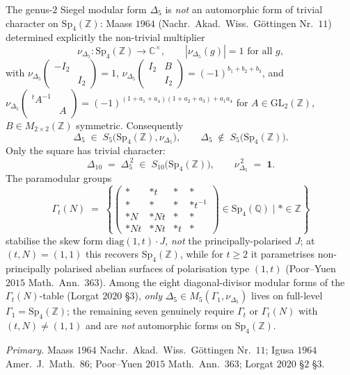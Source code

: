 \begin{remark}
\label{rem:qgfnd-delta5-automorphic-scope-langlands}
The genus-$2$ Siegel modular form $\Delta_5$ is \emph{not} an
automorphic form of trivial character on $\mathrm{Sp}_4(\mathbb Z)$:
Maass $1964$ (Nachr.\ Akad.\ Wiss.\ G\"ottingen Nr.\ $11$) determined
explicitly the non-trivial multiplier
\[
\nu_{\Delta_5}:\mathrm{Sp}_4(\mathbb Z)\longrightarrow\mathbb C^\times,
\qquad|\nu_{\Delta_5}(g)|=1\text{ for all }g,
\]
with $\nu_{\Delta_5}\!\left(\!\begin{smallmatrix}-I_2 & \\ & I_2\end{smallmatrix}\!\right)\!=\!1$,
$\nu_{\Delta_5}\!\left(\!\begin{smallmatrix}I_2 & B\\ & I_2\end{smallmatrix}\!\right)\!=\!(-1)^{b_1+b_2+b_3}$,
and $\nu_{\Delta_5}\!\left(\!\begin{smallmatrix} {}^tA^{-1} & \\ & A\end{smallmatrix}\!\right)\!=\!(-1)^{(1+a_1+a_4)(1+a_2+a_3)+a_1a_4}$
for $A\in\mathrm{GL}_2(\mathbb Z)$, $B\in M_{2\times 2}(\mathbb Z)$
symmetric. Consequently
\[
\Delta_5 \;\in\; S_5\bigl(\mathrm{Sp}_4(\mathbb Z),\nu_{\Delta_5}\bigr),
\qquad \Delta_5\;\notin\; S_5\bigl(\mathrm{Sp}_4(\mathbb Z)\bigr).
\]
Only the square has trivial character:
\[
\Delta_{10}\;=\;\Delta_5^{\,2}\;\in\; S_{10}\bigl(\mathrm{Sp}_4(\mathbb Z)\bigr),
\qquad \nu_{\Delta_5}^{\,2}\;=\;\mathbf 1.
\]
The paramodular groups
\[
\Gamma_t(N)\;=\;\left\{\begin{pmatrix} \ast & \ast t & \ast & \ast\\ \ast & \ast & \ast & \ast t^{-1}\\ \ast N & \ast Nt & \ast & \ast\\ \ast Nt & \ast Nt & \ast t & \ast\end{pmatrix}\in\mathrm{Sp}_4(\mathbb Q)\;\Big|\;\ast\in\mathbb Z\right\}
\]
stabilise the skew form $\mathrm{diag}(1,t)\cdot J$, \emph{not} the
principally-polarised $J$; at $(t,N)=(1,1)$ this recovers
$\mathrm{Sp}_4(\mathbb Z)$, while for $t\geq 2$ it parametrises
non-principally polarised abelian surfaces of polarisation type
$(1,t)$ (Poor--Yuen $2015$ Math.\ Ann.\ $363$). Among the eight
diagonal-divisor modular forms of the $\Gamma_t(N)$-table (Lorgat
$2020$ \S$3$), \emph{only} $\Delta_5\in M_5(\Gamma_1,\nu_{\Delta_5})$
lives on full-level $\Gamma_1=\mathrm{Sp}_4(\mathbb Z)$; the remaining
seven genuinely require $\Gamma_t$ or $\Gamma_t(N)$ with
$(t,N)\neq(1,1)$ and are \emph{not} automorphic forms on
$\mathrm{Sp}_4(\mathbb Z)$.

\emph{Primary.}
Maass $1964$ Nachr.\ Akad.\ Wiss.\ G\"ottingen Nr.\ $11$;
Igusa $1964$ Amer.\ J.\ Math.\ $86$;
Poor--Yuen $2015$ Math.\ Ann.\ $363$;
Lorgat $2020$ \S$2$ \S$3$.
\end{remark}

